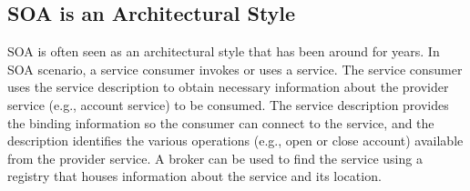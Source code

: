 \documentclass[12pt,a4paper,final,twoside,onecolumn,titlepage]{book}
\begin{document}
\subsection{SOA is an Architectural Style}
\gls{SOA} is often seen as an architectural style that has been around for years. In \gls{SOA} scenario, a service consumer invokes or uses a service. The service consumer uses the service description to obtain necessary information about the provider service (e.g., account service) to be consumed. The service description provides the binding information so the consumer can connect to the service, and the description identifies the various operations (e.g., open or close account) available from the provider service. A broker can be used to find the service using a registry that houses information about the service and its location.
\end{document}
